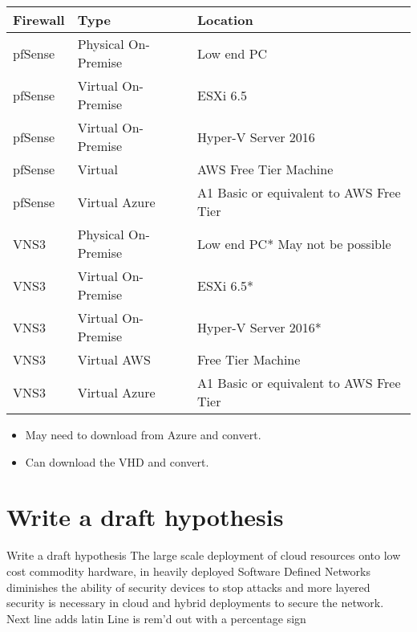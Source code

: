 \documentclass[12pt]{report}
\begin{document}
\maketitle
\begin{tabular}{|l|l|l|}
\hline
\textbf{Firewall} & \textbf{Type} & \textbf{Location}\\
\hline
pfSense & Physical On-Premise & Low end PC\\
\hline
pfSense & Virtual On-Premise & ESXi 6.5\\
\hline
pfSense & Virtual On-Premise & Hyper-V Server 2016\\
\hline
pfSense & Virtual & AWS	Free Tier Machine\\
\hline
pfSense & Virtual Azure & A1 Basic or equivalent to AWS Free Tier\\
\hline
VNS3 & Physical On-Premise & Low end PC* May not be possible\\
\hline
VNS3 & Virtual On-Premise & ESXi 6.5*\\
\hline
VNS3 & Virtual On-Premise & Hyper-V Server 2016*\\
\hline
VNS3 & Virtual AWS & Free Tier Machine\\
\hline
VNS3 & Virtual Azure & A1 Basic or equivalent to AWS Free Tier\\
\hline
\end{tabular}
\newline
\newline

\begin{itemize}
\item May need to download from Azure and convert.	
\item Can download the VHD and convert.
\end{itemize}
\newpage
\section*{Write a draft hypothesis}

Write a draft hypothesis
\newline
The large scale deployment of cloud resources onto low cost commodity hardware, in heavily deployed 
Software Defined Networks diminishes the ability of security devices to stop attacks and more layered
security is necessary in cloud and hybrid deployments to secure the network.
\newline
Next line adds latin
Line is rem'd out with a percentage sign
\newline
\end{document}
